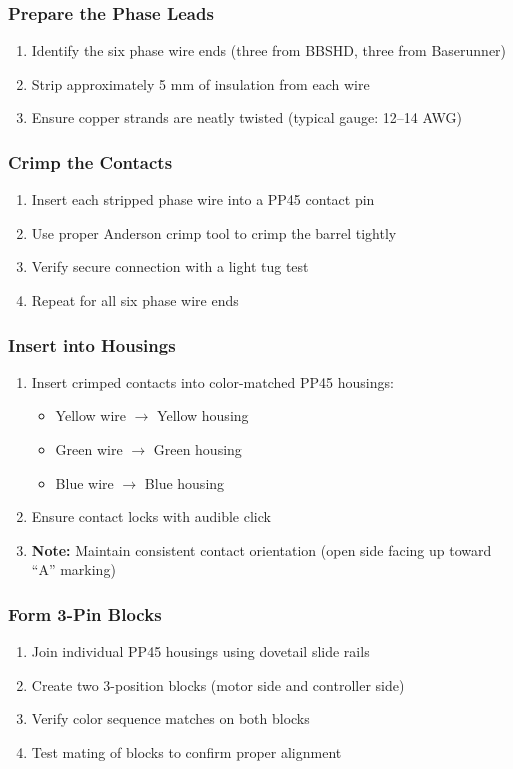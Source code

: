 \documentclass[11pt,a4paper]{article}
\newcommand{\note}[1]{\textcolor{notecolor}{\textbf{Note:} #1}}
\begin{document}
\subsubsection{Prepare the Phase Leads}
\begin{enumerate}
    \item Identify the six phase wire ends (three from BBSHD, three from Baserunner)
    \item Strip approximately 5 mm of insulation from each wire
    \item Ensure copper strands are neatly twisted (typical gauge: 12--14 AWG)
\end{enumerate}

\subsubsection{Crimp the Contacts}
\begin{enumerate}
    \item Insert each stripped phase wire into a PP45 contact pin
    \item Use proper Anderson crimp tool to crimp the barrel tightly
    \item Verify secure connection with a light tug test
    \item Repeat for all six phase wire ends
\end{enumerate}

\subsubsection{Insert into Housings}
\begin{enumerate}
    \item Insert crimped contacts into color-matched PP45 housings:
    \begin{itemize}
        \item Yellow wire $\rightarrow$ Yellow housing
        \item Green wire $\rightarrow$ Green housing
        \item Blue wire $\rightarrow$ Blue housing
    \end{itemize}
    \item Ensure contact locks with audible click
    \item \note{Maintain consistent contact orientation (open side facing up toward ``A'' marking)}
\end{enumerate}

\subsubsection{Form 3-Pin Blocks}
\begin{enumerate}
    \item Join individual PP45 housings using dovetail slide rails
    \item Create two 3-position blocks (motor side and controller side)
    \item Verify color sequence matches on both blocks
    \item Test mating of blocks to confirm proper alignment
\end{enumerate}
\end{document}
